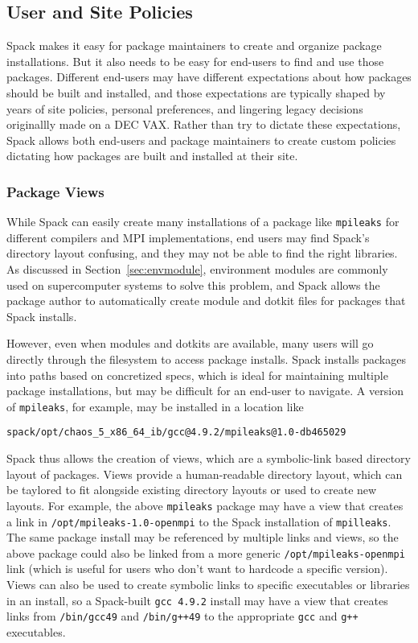 
\subsection{User and Site Policies}
\label{sec:usecase-policy}

Spack makes it easy for package maintainers to create and organize package installations.
But it also needs to be easy for end-users to find and use those packages.
Different end-users may have different expectations about how packages should be built and installed,
and those expectations are typically shaped by years of site policies, personal preferences,
and lingering legacy decisions originallly made on a DEC VAX.
Rather than try to dictate these expectations,
Spack allows both end-users and package maintainers to create custom policies dictating
how packages are built and installed at their site.

\subsubsection{Package Views}
\label{sec:package-views}

While Spack can easily create many installations of a package like {\tt mpileaks}
for different compilers and MPI implementations, end users may find Spack's directory layout
confusing, and they may not be able to find the right libraries.
As discussed in Section~\ref{sec:envmodule},
environment modules are commonly used on supercomputer systems to solve this problem,
and Spack allows the package author to automatically create module and dotkit files for packages that Spack installs.

However, even when modules and dotkits are available,
many users will go directly through the filesystem to access package installs.
Spack installs packages into paths based on concretized specs,
which is ideal for maintaining multiple package installations, but may be difficult for an end-user to navigate.
A version of {\tt mpileaks}, for example, may be installed in a location like
%
\begin{verbatim}
spack/opt/chaos_5_x86_64_ib/gcc@4.9.2/mpileaks@1.0-db465029
\end{verbatim}
%
Spack thus allows the creation of views, which are a symbolic-link based directory layout of packages.
Views provide a human-readable directory layout,
which can be taylored to fit alongside existing directory layouts or used to create new layouts.
For example, the above {\tt mpileaks} package may have a view that creates a link in
{\tt /opt/mpileaks-1.0-openmpi} to the Spack installation of {\tt mpilleaks}.
The same package install may be referenced by multiple links and views,
so the above package could also be linked from a more generic {\tt /opt/mpileaks-openmpi}
link (which is useful for users who don't want to hardcode a specific version).
Views can also be used to create symbolic links to specific executables or libraries in an install,
so a Spack-built {\tt gcc 4.9.2} install may have a view that creates links from
{\tt /bin/gcc49} and {\tt /bin/g++49} to the appropriate {\tt gcc} and {\tt g++} executables.

